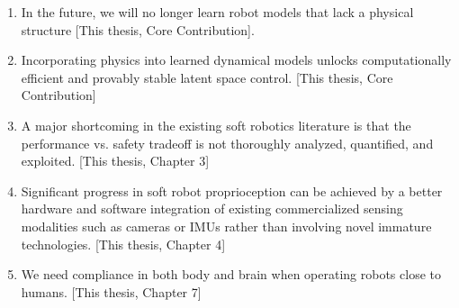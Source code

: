 \documentclass{propositions}
\begin{document}
\begin{enumerate}
    \item In the future, we will no longer learn robot models that lack a physical structure [This thesis, Core Contribution].
    \item Incorporating physics into learned dynamical models unlocks computationally efficient and provably stable latent space control. [This thesis, Core Contribution]
    \item A major shortcoming in the existing soft robotics literature is that the performance vs. safety tradeoff is not thoroughly analyzed, quantified, and exploited. [This thesis, Chapter 3]
    \item Significant progress in soft robot proprioception can be achieved by a better hardware and software integration of existing commercialized sensing modalities such as cameras or IMUs rather than involving novel immature technologies. [This thesis, Chapter 4]
    \item We need compliance in both body and brain when operating robots close to humans. [This thesis, Chapter 7]

\end{enumerate}
\end{document}
